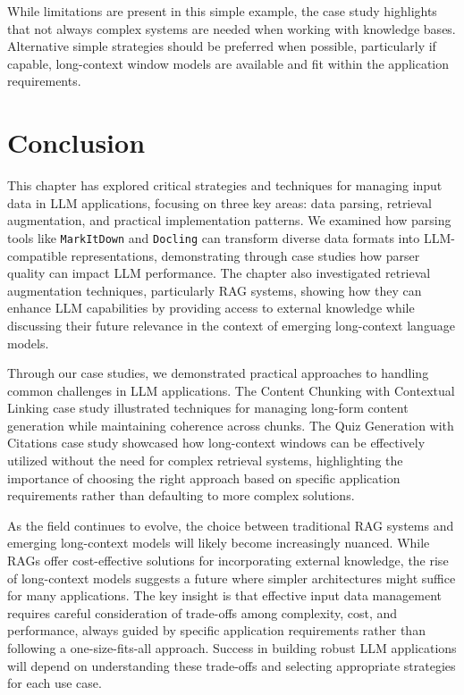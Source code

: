 While limitations are present in this simple example, the case study highlights that not always complex systems are needed when working with knowledge bases. Alternative simple strategies should be preferred when possible, particularly if capable, long-context window models are available and fit within the application requirements.

\section{Conclusion}
This chapter has explored critical strategies and techniques for managing input data in LLM applications, focusing on three key areas: data parsing, retrieval augmentation, and practical implementation patterns. We examined how parsing tools like \texttt{MarkItDown} and \texttt{Docling} can transform diverse data formats into LLM-compatible representations, demonstrating through case studies how parser quality can impact LLM performance. The chapter also investigated retrieval augmentation techniques, particularly RAG systems, showing how they can enhance LLM capabilities by providing access to external knowledge while discussing their future relevance in the context of emerging long-context language models.

Through our case studies, we demonstrated practical approaches to handling common challenges in LLM applications. The Content Chunking with Contextual Linking case study illustrated techniques for managing long-form content generation while maintaining coherence across chunks. The Quiz Generation with Citations case study showcased how long-context windows can be effectively utilized without the need for complex retrieval systems, highlighting the importance of choosing the right approach based on specific application requirements rather than defaulting to more complex solutions.

As the field continues to evolve, the choice between traditional RAG systems and emerging long-context models will likely become increasingly nuanced. While RAGs offer cost-effective solutions for incorporating external knowledge, the rise of long-context models suggests a future where simpler architectures might suffice for many applications. The key insight is that effective input data management requires careful consideration of trade-offs among complexity, cost, and performance, always guided by specific application requirements rather than following a one-size-fits-all approach. Success in building robust LLM applications will depend on understanding these trade-offs and selecting appropriate strategies for each use case.
